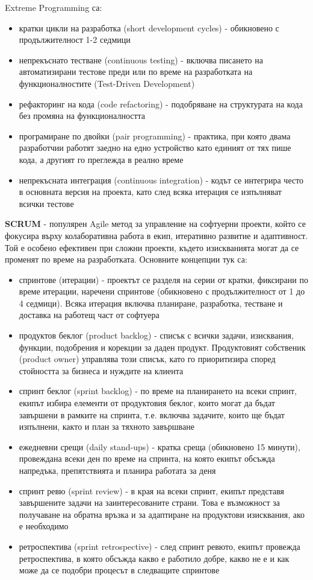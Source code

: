 \documentclass{article}
\begin{document}
Extreme Programming са:
\begin{itemize}
    \item кратки цикли на разработка (short development cycles) - обикновено с продължителност 1-2 седмици
    \item непрекъснато тестване (continuous testing) - включва писането на автоматизирани тестове преди или по време на разработката на функционалностите
    (Test-Driven Development)
    \item рефакторинг на кода (code refactoring) - подобряване на структурата на кода без промяна на функционалността
    \item програмиране по двойки (pair programming) - практика, при която двама разработчии работят заедно на едно устройство като
    единият от тях пише кода, а другият го преглежда в реално време
    \item непрекъсната интеграция (continuous integration) - кодът се интегрира често в основната версия на проекта, като след всяка
    итерация се изпълняват всички тестове
\end{itemize}
\textbf{SCRUM} - популярен Agile метод за управление на софтуерни проекти, който се фокусира върху колаборативна работа в екип, итеративно
развитие и адаптивност. Той е особено ефективен при сложни проекти, където изискванията могат да се променят по време на разработката.
Основните концепции тук са:
\begin{itemize}
    \item спринтове (итерации) - проектът се разделя на серии от кратки, фиксирани по време итерации, наречени спринтове (обикновено с
    продължителност от 1 до 4 седмици). Всяка итерация включва планиране, разработка, тестване и доставка на работещ част от софтуера
    \item продуктов беклог (product backlog) - списък с всички задачи, изисквания, функции, подобрения и корекции за даден продукт.
    Продуктовият собственик (product owner) управлява този списък, като го приоритизира според стойността за бизнеса и нуждите на клиента
    \item спринт беклог (sprint backlog) - по време на планирането на всеки спринт, екипът избира елементи от продуктовия беклог, които
    могат да бъдат завършени в рамките на спринта, т.е. включва задачите, които ще бъдат изпълнени, както и план за тяхното завършване
    \item ежедневни срещи (daily stand-ups) - кратка среща (обикновено 15 минути), провеждана всеки ден по време на спринта, на която
    екипът обсъжда напредъка, препятствията и планира работата за деня
    \item спринт ревю (sprint review) - в края на всеки спринт, екипът представя завършените задачи на заинтересованите страни. Това е
    възможност за получаване на обратна връзка и за адаптиране на продуктови изисквания, ако е необходимо
    \item ретроспектива (sprint retrospective) - след спринт ревюто, екипът провежда ретроспектива, в която обсъжда какво е работило добре,
    какво не е и как може да се подобри процесът в следващите спринтове
\end{itemize}
\end{document}
